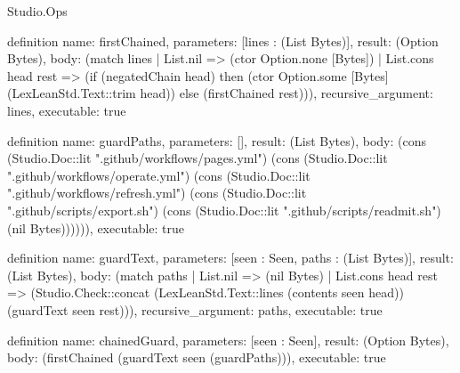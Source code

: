 \begin{lexlean}{Studio.Ops}
\begin{semanticmodule}
{definition{
  name: firstChained,
  parameters: [lines : (List Bytes)],
  result: (Option Bytes),
  body: (match lines
    | List.nil => (ctor Option.none [Bytes])
    | List.cons head rest => (if (negatedChain head) then (ctor Option.some [Bytes] (LexLeanStd.Text::trim head)) else (firstChained rest))),
  recursive_argument: lines,
  executable: true
}

definition{
  name: guardPaths,
  parameters: [],
  result: (List Bytes),
  body: (cons (Studio.Doc::lit ".github/workflows/pages.yml") (cons (Studio.Doc::lit ".github/workflows/operate.yml") (cons (Studio.Doc::lit ".github/workflows/refresh.yml") (cons (Studio.Doc::lit ".github/scripts/export.sh") (cons (Studio.Doc::lit ".github/scripts/readmit.sh") (nil Bytes)))))),
  executable: true
}

definition{
  name: guardText,
  parameters: [seen : Seen, paths : (List Bytes)],
  result: (List Bytes),
  body: (match paths
    | List.nil => (nil Bytes)
    | List.cons head rest => (Studio.Check::concat (LexLeanStd.Text::lines (contents seen head)) (guardText seen rest))),
  recursive_argument: paths,
  executable: true
}

definition{
  name: chainedGuard,
  parameters: [seen : Seen],
  result: (Option Bytes),
  body: (firstChained (guardText seen (guardPaths))),
  executable: true
}

}
\end{semanticmodule}
\end{lexlean}
